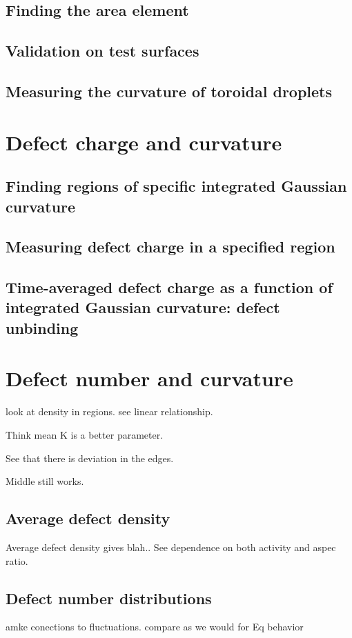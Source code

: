 \subsection{Finding the area element}
\subsection{Validation on test surfaces}
\subsection{Measuring the curvature of toroidal droplets}

\section{Defect charge and curvature}
\subsection{Finding regions of specific integrated Gaussian curvature}
\subsection{Measuring defect charge in a specified region}
\subsection{Time-averaged defect charge as a function of integrated Gaussian curvature: defect unbinding}

\section{Defect number and curvature}
look at density in regions. see linear relationship.

Think mean K is a better parameter.

See that there is deviation in the edges.

Middle still works.

\subsection{Average defect density}
Average defect density gives blah..
See dependence on both activity and aspec ratio.


\subsection{Defect number distributions}
amke conections to fluctuations. compare as we would for Eq behavior

